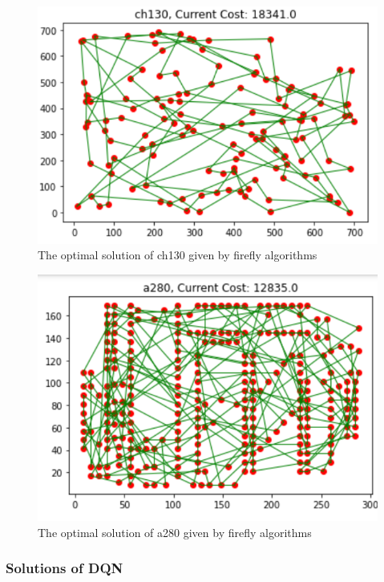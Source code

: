 \documentclass[twocolumn, a4paper]{extarticle}
\begin{document}
\begin{figure}[H]
	\centering
	\includegraphics[width=0.95\linewidth]{figure/fire_ch130}
	\caption{The optimal solution of ch130 given by firefly algorithms}
	\label{fig:firech130}
\end{figure}

\begin{figure}[H]
	\centering
	\includegraphics[width=0.95\linewidth]{figure/fire_a280}
	\caption{The optimal solution of a280 given by firefly algorithms}
	\label{fig:firea280}
\end{figure}




\subsubsection{Solutions of DQN}
\end{document}
